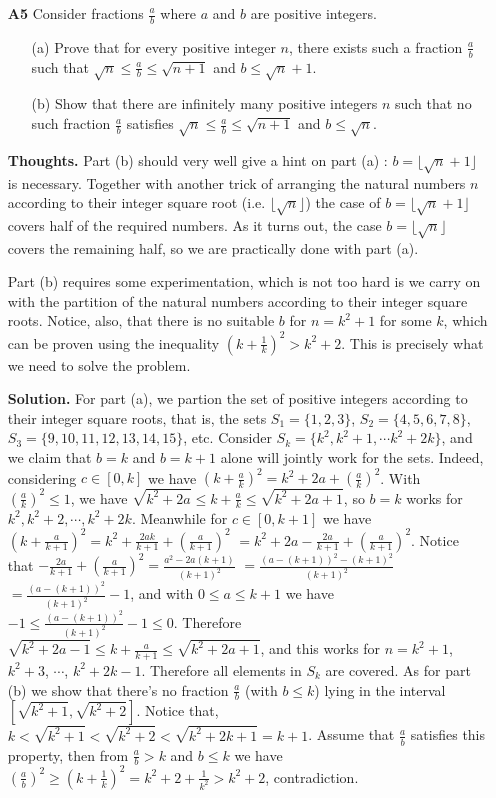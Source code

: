 \documentclass[11pt,a4paper]{article}
\begin{document}
\begin{itemize}
\begin{itemize}
\end{itemize}

\item[\textbf{A5}]
Consider fractions $\frac{a}{b}$ where $a$ and $b$ are positive integers.
\begin{itemize}
\item[(a)]
Prove that for every positive integer $n$, there exists such a fraction $\frac{a}{b}$ such that $\sqrt{n} \le \frac{a}{b} \le \sqrt{n+1}$ and $b \le \sqrt{n}+1$.
\item[(b)]
Show that there are infinitely many positive integers $n$ such that no such fraction $\frac{a}{b}$ satisfies $\sqrt{n} \le \frac{a}{b} \le \sqrt{n+1}$ and $b \le \sqrt{n}$. 
\end{itemize}

\textbf{Thoughts.} 
Part (b) should very well give a hint on part (a) : $b=\lfloor\sqrt{n}+1\rfloor$ is necessary. 
Together with another trick of arranging the natural numbers $n$ according to their integer square root 
(i.e. $\lfloor\sqrt{n}\rfloor$) the case of $b=\lfloor\sqrt{n}+1\rfloor$ covers half of the required numbers. 
As it turns out, the case $b=\lfloor\sqrt{n}\rfloor$ covers the remaining half, so we are practically done with part (a). 

Part (b) requires some experimentation, which is not too hard is we carry on with the partition of the natural numbers according to their integer square roots. 
Notice, also, that there is no suitable $b$ for $n=k^2+1$ for some $k$, which can be proven using the inequality 
$(k+\frac 1k)^2>k^2+2$. This is precisely what we need to solve the problem. 

\textbf{Solution.} 
For part (a), we partion the set of positive integers according to their integer square roots, 
that is, the sets $S_1=\{1,2,3\}$, $S_2=\{4,5,6,7,8\}$, $S_3=\{9,10,11,12,13,14,15\}$, etc. 
Consider $S_k=\{k^2, k^2+1, \cdots k^2+2k\}$, 
and we claim that $b=k$ and $b=k+1$ alone will jointly work for the sets. 
Indeed, considering $c\in [0, k]$ we have $(k+\frac ak)^2=k^2+2a+(\frac ak)^2$. 
With $(\frac ak)^2\le 1$, we have $\sqrt{k^2+2a}\le k+\frac ak\le \sqrt{k^2+2a+1}$, 
so $b=k$ works for $k^2, k^2+2, \cdots , k^2+2k$. 
Meanwhile for $c\in [0, k+1]$ we have $(k+\frac a{k+1})^2=k^2+\frac{2ak}{k+1}+(\frac a{k+1})^2$
$=k^2+2a-\frac{2a}{k+1}+(\frac a{k+1})^2$. 
Notice that $-\frac{2a}{k+1}+(\frac a{k+1})^2=\frac{a^2-2a(k+1)}{(k+1)^2}$
$=\frac{(a-(k+1))^2-(k+1)^2}{(k+1)^2}$
$=\frac{(a-(k+1))^2}{(k+1)^2}-1$, 
and with $0\le a\le k+1$ we have 
$-1\le \frac{(a-(k+1))^2}{(k+1)^2}-1\le 0$. 
Therefore 
$\sqrt{k^2+2a-1}\le k+\frac a{k+1}\le \sqrt{k^2+2a+1}$, 
and this works for $n=k^2+1$, $k^2+3$, $\cdots$, $k^2+2k-1$. 
Therefore all elements in $S_k$ are covered. 
As for part (b) we show that there's no fraction $\frac ab$ (with $b\le k$) lying in the interval $[\sqrt{k^2+1}, \sqrt{k^2+2}]$. 
Notice that, $k< \sqrt{k^2+1} < \sqrt{k^2+2} < \sqrt{k^2+2k+1} =k+1$. 
Assume that $\frac ab$ satisfies this property, 
then from $\frac ab > k$ and $b\le k$ we have 
$(\frac ab)^2\ge (k+\frac 1k)^2=k^2+2+\frac 1{k^2} > k^2+2$, contradiction. 


\end{itemize}
\end{document}
